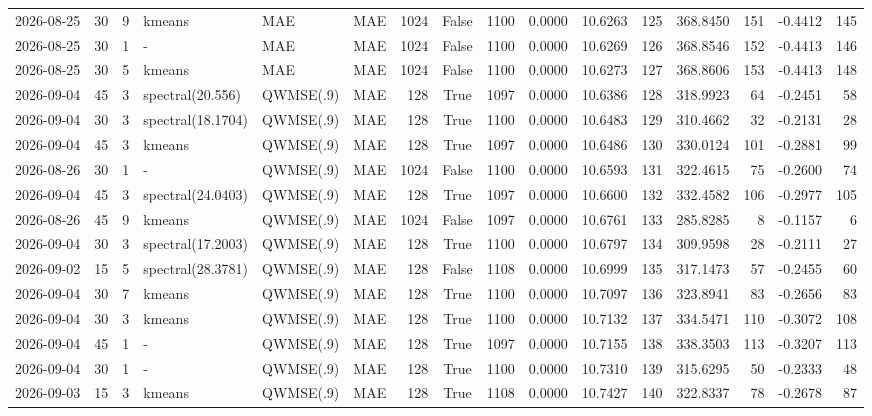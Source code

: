 \documentclass[10pt]{article}
\begin{document}
\begin{landscape}
\begin{longtable}{@{}lrrlllrcrrrrrrrr@{}}
2026-08-25 & 30 & 9 & kmeans & MAE & MAE & 1024 & False & 1100 & 0.0000 & 10.6263 & 125 & 368.8450 & 151 & -0.4412 & 145 \\
2026-08-25 & 30 & 1 & - & MAE & MAE & 1024 & False & 1100 & 0.0000 & 10.6269 & 126 & 368.8546 & 152 & -0.4413 & 146 \\
2026-08-25 & 30 & 5 & kmeans & MAE & MAE & 1024 & False & 1100 & 0.0000 & 10.6273 & 127 & 368.8606 & 153 & -0.4413 & 148 \\
2026-09-04 & 45 & 3 & spectral(20.556) & QWMSE(.9) & MAE & 128 & True & 1097 & 0.0000 & 10.6386 & 128 & 318.9923 & 64 & -0.2451 & 58 \\
2026-09-04 & 30 & 3 & spectral(18.1704) & QWMSE(.9) & MAE & 128 & True & 1100 & 0.0000 & 10.6483 & 129 & 310.4662 & 32 & -0.2131 & 28 \\
2026-09-04 & 45 & 3 & kmeans & QWMSE(.9) & MAE & 128 & True & 1097 & 0.0000 & 10.6486 & 130 & 330.0124 & 101 & -0.2881 & 99 \\
2026-08-26 & 30 & 1 & - & QWMSE(.9) & MAE & 1024 & False & 1100 & 0.0000 & 10.6593 & 131 & 322.4615 & 75 & -0.2600 & 74 \\
2026-09-04 & 45 & 3 & spectral(24.0403) & QWMSE(.9) & MAE & 128 & True & 1097 & 0.0000 & 10.6600 & 132 & 332.4582 & 106 & -0.2977 & 105 \\
2026-08-26 & 45 & 9 & kmeans & QWMSE(.9) & MAE & 1024 & False & 1097 & 0.0000 & 10.6761 & 133 & 285.8285 & 8 & -0.1157 & 6 \\
2026-09-04 & 30 & 3 & spectral(17.2003) & QWMSE(.9) & MAE & 128 & True & 1100 & 0.0000 & 10.6797 & 134 & 309.9598 & 28 & -0.2111 & 27 \\
2026-09-02 & 15 & 5 & spectral(28.3781) & QWMSE(.9) & MAE & 128 & False & 1108 & 0.0000 & 10.6999 & 135 & 317.1473 & 57 & -0.2455 & 60 \\
2026-09-04 & 30 & 7 & kmeans & QWMSE(.9) & MAE & 128 & True & 1100 & 0.0000 & 10.7097 & 136 & 323.8941 & 83 & -0.2656 & 83 \\
2026-09-04 & 30 & 3 & kmeans & QWMSE(.9) & MAE & 128 & True & 1100 & 0.0000 & 10.7132 & 137 & 334.5471 & 110 & -0.3072 & 108 \\
2026-09-04 & 45 & 1 & - & QWMSE(.9) & MAE & 128 & True & 1097 & 0.0000 & 10.7155 & 138 & 338.3503 & 113 & -0.3207 & 113 \\
2026-09-04 & 30 & 1 & - & QWMSE(.9) & MAE & 128 & True & 1100 & 0.0000 & 10.7310 & 139 & 315.6295 & 50 & -0.2333 & 48 \\
2026-09-03 & 15 & 3 & kmeans & QWMSE(.9) & MAE & 128 & True & 1108 & 0.0000 & 10.7427 & 140 & 322.8337 & 78 & -0.2678 & 87 \\

\end{longtable}
\end{landscape}
\end{document}
